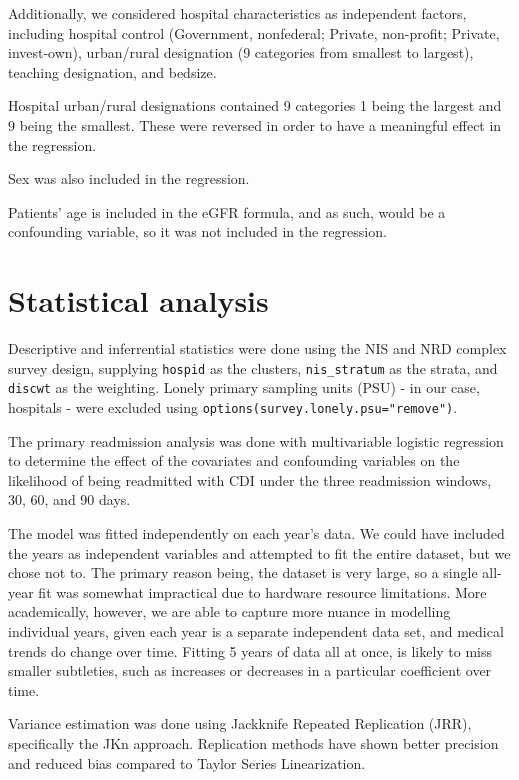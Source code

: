 \documentclass[12pt]{ociamthesis}\usepackage[]{graphicx}\usepackage[]{color}
\begin{document}
Additionally, we considered hospital characteristics as independent factors, including hospital control (Government, nonfederal; Private, non-profit; Private, invest-own), 
urban/rural designation (9 categories from smallest to largest), teaching designation, and bedsize. 

Hospital urban/rural designations contained 9 categories 1 being the largest and 9 being the smallest. These were reversed in order to have a meaningful effect in the regression.

Sex was also included in the regression.

Patients' age is included in the eGFR formula, and as such, would be a confounding variable, so it was not included in the regression.

\section{Statistical analysis}

Descriptive and inferrential statistics were done using the NIS and NRD complex survey design, 
supplying \texttt{hospid} as the clusters, \texttt{nis\_stratum} as the strata, and \texttt{discwt} as the weighting. 
Lonely primary sampling units (PSU) - in our case, hospitals - were excluded using \texttt{options(survey.lonely.psu="remove")}. \cite{LonelyPSUs}

The primary readmission analysis was done with multivariable logistic regression to determine the effect of the covariates and confounding variables
on the likelihood of being readmitted with CDI under the three readmission windows, 30, 60, and 90 days. 

The model was fitted independently on each year's data. 
We could have included the years as independent variables and attempted to fit the entire dataset, but we chose not to. The primary reason being, the dataset is very large,
so a single all-year fit was somewhat impractical due to hardware resource limitations. More academically, however, we are able to capture more nuance in modelling individual
years, given each year is a separate independent data set, and medical trends do change over time. Fitting 5 years of data all at once, is likely to miss smaller subtleties, 
such as increases or decreases in a particular coefficient over time. 

Variance estimation was done using Jackknife Repeated Replication (JRR), specifically the JKn approach. Replication methods have shown better
precision and reduced bias compared to Taylor Series Linearization. \cite{Chowdhury2013, Smith2000}
\end{document}
